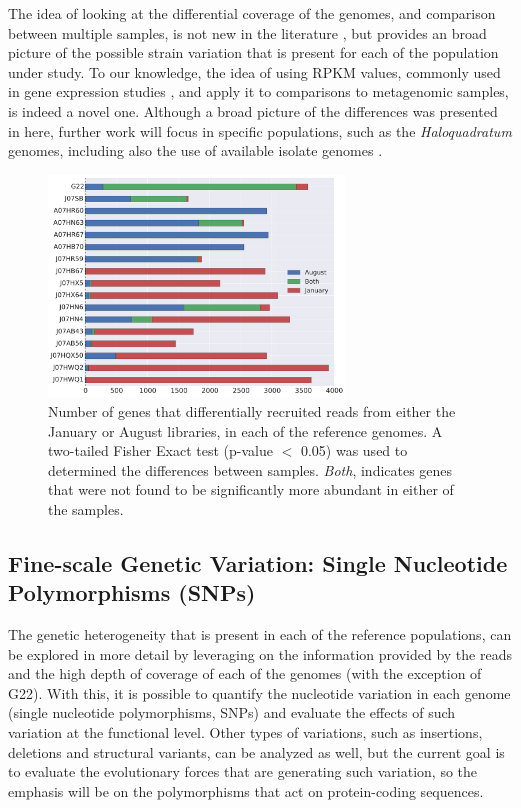 The idea of looking at the differential coverage of the genomes, and comparison between multiple samples, is not new in the literature \cite{DyallSmith:2011tu,Pasic:2009bo}, but provides an broad picture of the possible strain variation that is present for each of the population under study. To our knowledge, the idea of using RPKM values, commonly used in gene expression studies \cite{Mortazavi:2008jj}, and apply it to comparisons to metagenomic samples, is indeed a novel one. Although a broad picture of the differences was presented in here, further work will focus in specific populations, such as the \textit{Haloquadratum} genomes, including also the use of available isolate genomes \cite{DyallSmith:2011tu}.

\begin{figure}[!hbtp]
  \centering
  \includegraphics[width=0.7\textwidth]{Chapter5/Figures/GeneDifferencesSeason.pdf}
  \caption{Number of genes that differentially recruited reads from either the January or August libraries, in each of the reference genomes. A two-tailed Fisher Exact test (p-value $<$ 0.05) was used to determined the differences between samples. \textit{Both}, indicates genes that were not found to be significantly more abundant in either of the samples.} 
  \label{CoverageGenes}
\end{figure}

\clearpage
\subsection{Fine-scale Genetic Variation: Single Nucleotide Polymorphisms (SNPs)}

The genetic heterogeneity that is present in each of the reference populations, can be explored in more detail by leveraging on the information provided by the reads and the high depth of coverage of each of the genomes (with the exception of G22). With this, it is possible to quantify the nucleotide variation in each genome (single nucleotide polymorphisms, SNPs) and evaluate the effects of such variation at the functional level. Other types of variations, such as insertions, deletions and structural variants, can be analyzed as well, but the current goal is to evaluate the evolutionary forces that are generating such variation, so the emphasis will be on the polymorphisms that act on protein-coding sequences.

